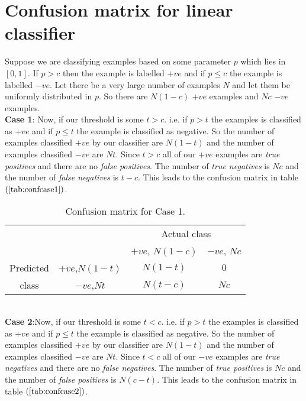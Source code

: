 \documentclass{article}
\begin{document}
\section{Confusion matrix for linear classifier}
Suppose we are classifying examples based on some parameter $p$ which lies in $[0,1]$. If $p>c$ then the example is labelled $+ve$ and if $p\le{c}$ the example is labelled $-ve$. Let there be a very large number of examples $N$ and let them be uniformly distributed in $p$. So there are $N(1-c)$ $+ve$ examples and $Nc$ $-ve$ examples.\\
\textbf{Case 1}: Now, if our threshold is some $t > c$. i.e. if $p>t$ the examples is classified as $+ve$ and if $p\le{t}$ the example is classified as negative. So the number of examples classified $+ve$ by our classifier are $N(1-t)$ and the number of examples classified $-ve$ are $Nt$. Since $t>c$ all of our $+ve$ examples are \textit{true positives} and there are no \textit{false positives}. The number of \textit{true negatives} is $Nc$ and the number of \textit{false negatives} is $t-c$. This leads to the confusion matrix in table $(\ref{tab:confcase1})$.
\begin{table}
\begin{center}
  \begin{tabular}{cccc}
    \cline{3-4}
    & & \multicolumn{2}{|c|}{Actual class}  \\
    \cline{3-4}
    & & \multicolumn{1}{|c|}{$+ve$, $N(1-c)$} &  \multicolumn{1}{|c|}{$-ve$, $Nc$}\\
    \hline
    \multicolumn{1}{|c}{Predicted} & \multicolumn{1}{|c|}{$+ve$,$N(1-t)$} & \multicolumn{1}{|c|}{$N(1-t)$} & \multicolumn{1}{|c|}{$0$} \\
    \cline{2-4}
    \multicolumn{1}{|c}{class} & \multicolumn{1}{|c|}{$-ve$,$Nt$} & \multicolumn{1}{|c|}{$N(t-c)$} & \multicolumn{1}{|c|}{$Nc$}\\
    \hline
  \end{tabular}
\end{center}
\caption{\label{tab:confcase1} Confusion matrix for Case 1.}
\end{table}\\
%
\textbf{Case 2}:Now, if our threshold is some $t < c$. i.e. if $p>t$ the examples is classified as $+ve$ and if $p\le{t}$ the example is classified as negative. So the number of examples classified $+ve$ by our classifier are $N(1-t)$ and the number of examples classified $-ve$ are $Nt$. Since $t<c$ all of our $-ve$ examples are \textit{true negatives} and there are no \textit{false negatives}. The number of \textit{true positives} is $Nc$ and the number of \textit{false positives} is $N(c-t)$. This leads to the confusion matrix in table $(\ref{tab:confcase2})$.
\end{document}
